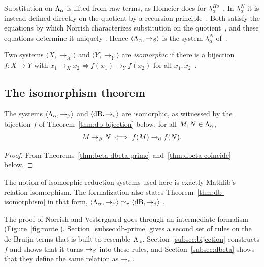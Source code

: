 Substitution on $\Lambda_{\alpha}$ is lifted from raw terms, as Homeier does for
$\lambda^{Ho}_{\alpha}$~\cite[Section~2.1]{norrish2007a}. In
$\lambda^{N}_{\alpha}$ it is instead defined directly on the
quotient by a recursion principle~\cite[Section~2.1]{norrish2006a}.
Both satisfy the equations by which Norrish characterizes substitution
on the quotient~\cite[(6)]{norrish2006a}, and these equations determine
it uniquely
.
Hence $\langle \Lambda_{\alpha}, \to_{\beta} \rangle$ is the system
$\lambda^{N}_{\alpha}$ of~\cite{norrish2007a}.

Two systems $\langle X, \to_X \rangle$ and $\langle Y, \to_Y \rangle$
are \emph{isomorphic} if there is a bijection $f \colon X \to Y$ with
$x_1 \to_X x_2 \iff f(x_1) \to_Y f(x_2)$ for all
$x_1, x_2$~\cite[Section~2.3]{norrish2007a}.

\subsection{The isomorphism theorem}
\label{subsec:isomorphism}

\begin{theorem}
\label{thm:db-isomorphism}
The systems $\langle \Lambda_{\alpha}, \to_{\beta} \rangle$ and
$\langle \mathrm{dB}, \to_{\mathrm{d}} \rangle$ are isomorphic, as witnessed by the
bijection $f$ of Theorem~\ref{thm:db-bijection} below: for all
$M, N \in \Lambda_{\alpha}$,
\[
  M \to_{\beta} N \iff f(M) \to_{\mathrm{d}} f(N).
\]
\end{theorem}

\begin{proof}
From Theorems~\ref{thm:beta-dbeta-prime}
and~\ref{thm:dbeta-coincide} below.
\end{proof}

The notion of isomorphic reduction systems used here is exactly
Mathlib's relation isomorphism. The formalization also states
Theorem~\ref{thm:db-isomorphism} in that form,
$\langle \Lambda_{\alpha}, \to_{\beta} \rangle \simeq_r \langle \mathrm{dB}, \to_{\mathrm{d}} \rangle$
.

The proof of Norrish and Vestergaard goes through an intermediate
formalism (Figure~\ref{fig:route}).
Section~\ref{subsec:db-prime} gives a second set of rules on the de
Bruijn terms that is built to resemble $\Lambda_{\alpha}$.
Section~\ref{subsec:bijection} constructs $f$ and shows that it turns
$\to_{\beta}$ into these rules, and Section~\ref{subsec:dbeta} shows that
they define the same relation as $\to_{\mathrm{d}}$.

